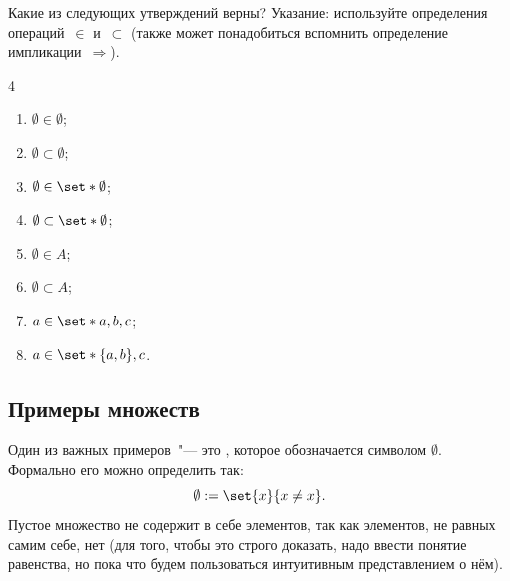 \begin{exercise}
	Какие из следующих утверждений верны? Указание: используйте
	определения операций~$\in$ и~$\subset$ (также может понадобиться
	вспомнить определение импликации~$\Longrightarrow$).
	\begin{multicols}{4}
		\begin{enumerate}[1)]
			\item $\emptyset \in     \emptyset$;
			\item $\emptyset \subset \emptyset$;
			\item $\emptyset \in     \set*{\emptyset}$;
			\item $\emptyset \subset \set*{\emptyset}$;
			\item $\emptyset \in     A$;
			\item $\emptyset \subset A$;
			\item $a \in \set*{a, b, c}$;
			\item $a \in \set*{ \{ a, b \}, c}$.
		\end{enumerate}
	\end{multicols}
\end{exercise}

\subsection{Примеры множеств}

\begin{example}
	Один из важных примеров~"--- это , которое
	обозначается символом $\emptyset$. Формально его можно определить так:
	\[
		\emptyset := \set{x}{x \neq x}
		.
	\]
	Пустое множество не содержит в себе элементов, так как элементов, не равных
	самим себе, нет (для того, чтобы это строго доказать, надо ввести понятие
	равенства, но пока что будем пользоваться интуитивным представлением о нём).
\end{example}

